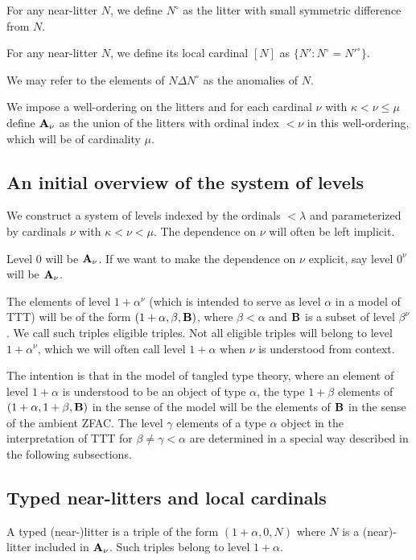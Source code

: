\documentclass[12pt]{article}
\begin{document}
For any near-litter $N$, we define $N^\circ$ as the litter with small symmetric difference from $N$.

For any near-litter $N$, we define its local cardinal $[N]$ as $\{N':N^{\circ} = N'^{\circ}\}$.

We may refer to the elements of $N \Delta N^{\circ}$ as the anomalies of $N$.

We impose a well-ordering on the litters and for each cardinal $\nu$ with $\kappa<\nu \leq \mu$  define ${\bf A}_\nu$ as the union of the litters with ordinal index $<\nu$ in this well-ordering, which will be of cardinality $\mu$.

\subsection{An initial overview of the system of levels}

We construct a system of levels indexed by the ordinals $<\lambda$ and parameterized by cardinals $\nu$ with $\kappa<\nu<\mu$.  The dependence on $\nu$ will often be left implicit.

Level 0 will be ${\bf A}_\nu$.  If we want to make the dependence on $\nu$ explicit, say level $0^{\nu}$ will be ${\bf A}_\nu$. 

The elements of level $1+\alpha^{\nu}$ (which is intended to serve as level $\alpha$ in a model of TTT) will be of the form $(1+\alpha,\beta,{\bf B})$, where $\beta<\alpha$
and ${\bf B}$ is a subset of level $\beta^{\nu}$.  We call such triples eligible triples.  Not all eligible triples will belong to level $1+\alpha^{\nu}$, which we will often call level $1+\alpha$ when $\nu$ is understood from context.

The intention is that in the model of tangled type theory, where an element of level $1+\alpha$ is understood to be an object of type $\alpha$, the type $1+\beta$ elements of
$(1+\alpha,1+\beta,{\bf B})$ in the sense of the model will be the elements of ${\bf B}$ in the sense of the ambient ZFAC.  The level $\gamma$ elements of a type $\alpha$ object in the interpretation of TTT for $\beta \neq \gamma <\alpha$ are determined in a special way described in the following subsections.

\subsection{Typed near-litters and local cardinals}

A typed (near-)litter is a triple of the form $(1+\alpha,0,N)$ where $N$ is a (near)-litter included in ${\bf A}_\nu$.  Such triples belong to level $1+\alpha$.
\end{document}
